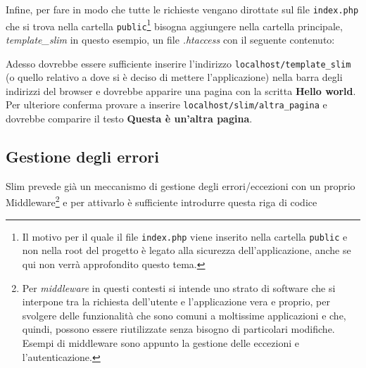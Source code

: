Infine, per fare in modo che tutte le richieste vengano dirottate sul
file \texttt{index.php} che si trova nella cartella
\texttt{public}\footnote{Il motivo per il quale il file
  \texttt{index.php} viene inserito nella cartella \texttt{public} e non
  nella root del progetto è legato alla sicurezza dell'applicazione,
  anche se qui non verrà approfondito questo tema.} bisogna aggiungere
nella cartella principale, \emph{template\_slim} in questo esempio, un
file \emph{.htaccess} con il seguente contenuto:

\begin{Shaded}
\begin{Highlighting}[]

\end{Highlighting}
\end{Shaded}

Adesso dovrebbe essere sufficiente inserire l'indirizzo
\texttt{localhost/template\_slim} (o quello relativo a dove si è deciso
di mettere l'applicazione) nella barra degli indirizzi del browser e
dovrebbe apparire una pagina con la scritta \textbf{Hello world}. Per
ulteriore conferma provare a inserire
\texttt{localhost/slim/altra\_pagina} e dovrebbe comparire il testo
\textbf{Questa è un'altra pagina}.

\hypertarget{gestione-degli-errori}{%
\subsection{Gestione degli errori}\label{gestione-degli-errori}}

Slim prevede già un meccanismo di gestione degli errori/eccezioni con un
proprio Middleware\footnote{Per \emph{middleware} in questi contesti si
  intende uno strato di software che si interpone tra la richiesta
  dell'utente e l'applicazione vera e proprio, per svolgere delle
  funzionalità che sono comuni a moltissime applicazioni e che, quindi,
  possono essere riutilizzate senza bisogno di particolari modifiche.
  Esempi di middleware sono appunto la gestione delle eccezioni e
  l'autenticazione.} e per attivarlo è sufficiente introdurre questa
riga di codice

\begin{Shaded}
\begin{Highlighting}[]
 \OperatorTok{=} \OtherTok{,} \OtherTok{,} \NormalTok{)}\OtherTok{;}
\end{Highlighting}
\end{Shaded}

